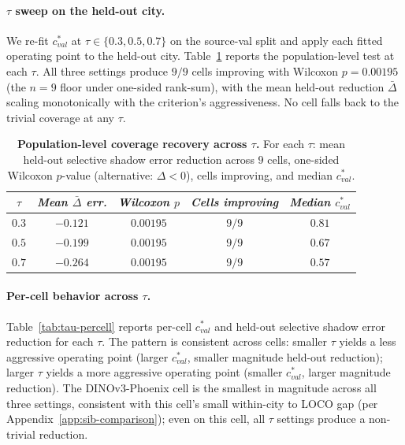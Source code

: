 \paragraph{$\tau$ sweep on the held-out city.} We re-fit $c^*_{val}$ at $\tau \in \{0.3, 0.5, 0.7\}$ on the source-val split and apply each fitted operating point to the held-out city. Table~\ref{tab:tau-sweep} reports the population-level test at each $\tau$. All three settings produce $9/9$ cells improving with Wilcoxon $p = 0.00195$ (the $n = 9$ floor under one-sided rank-sum), with the mean held-out reduction $\bar\Delta$ scaling monotonically with the criterion's aggressiveness. No cell falls back to the trivial coverage at any $\tau$.

\begin{table}[h]
\centering
\small
\setlength{\tabcolsep}{8pt}
\caption{\textbf{Population-level coverage recovery across $\tau$.} For each $\tau$: mean held-out selective shadow error reduction across $9$ cells, one-sided Wilcoxon $p$-value (alternative: $\Delta < 0$), cells improving, and median $c^*_{val}$.}
\label{tab:tau-sweep}
\begin{tabular}{ccccc}
\toprule
$\tau$ & \textit{Mean $\bar\Delta$ err.} & \textit{Wilcoxon $p$} & \textit{Cells improving} & \textit{Median $c^*_{val}$} \\
\midrule
$0.3$ & $-0.121$ & $0.00195$ & $9 / 9$ & $0.81$ \\
$0.5$ & $-0.199$ & $0.00195$ & $9 / 9$ & $0.67$ \\
$0.7$ & $-0.264$ & $0.00195$ & $9 / 9$ & $0.57$ \\
\bottomrule
\end{tabular}
\end{table}

\paragraph{Per-cell behavior across $\tau$.} Table~\ref{tab:tau-percell} reports per-cell $c^*_{val}$ and held-out selective shadow error reduction for each $\tau$. The pattern is consistent across cells: smaller $\tau$ yields a less aggressive operating point (larger $c^*_{val}$, smaller magnitude held-out reduction); larger $\tau$ yields a more aggressive operating point (smaller $c^*_{val}$, larger magnitude reduction). The DINOv3-Phoenix cell is the smallest in magnitude across all three settings, consistent with this cell's small within-city to LOCO gap (per Appendix~\ref{app:sib-comparison}); even on this cell, all $\tau$ settings produce a non-trivial reduction.


